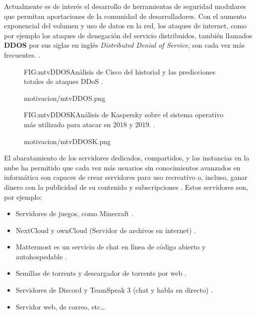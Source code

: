 Actualmente es de interés  \cite{mtvINTR} el desarrollo de herramientas de seguridad modulares que permitan aportaciones de la comunidad de desarrolladores. Con el aumento exponencial del volumen y uso de datos en la red, los ataques de internet, como por ejemplo los ataques de denegación del servicio distribuidos, también llamados \textbf{DDOS} por sus siglas en inglés \textit{Distributed Denial of Service}, son cada vez más frecuentes. \cite{mtvMine}.

\begin{figure}[Análisis de Cisco del historial y las predicciones totales de ataques DDoS.]{FIG:mtvDDOS}{Análisis de Cisco del historial y las predicciones totales de ataques DDoS \cite{mtvDDOSCISCO}.}
  \begin{image}{}{}{motivacion/mtvDDOS.png}
  \end{image}
\end{figure}

\begin{figure}[Análisis de Kaspersky sobre DDOS.]{FIG:mtvDDOSK}{Análisis de Kaspersky sobre el sistema operativo más utilizado para atacar en 2018 y 2019. \cite{mtvDDOSK}.}
  \begin{image}{}{}{motivacion/mtvDDOSK.png}
  \end{image}
\end{figure}


El abaratamiento de los servidores dedicados, compartidos, y las instancias en la nube \cite{mtvPrecios} ha permitido que cada vez más usuarios sin conocimientos avanzados en informática son capaces de crear servidores para uso recreativo o, incluso, ganar dinero con la publicidad  \cite{mtvGoogle} de su contenido y subscripciones \cite{mtvMine}.  Estos servidores son, por ejemplo:
\\
\begin{itemize}
\item Servidores de juegos, como Minecraft \cite{mtvMines}.
\item NextCloud y ownCloud (Servidor de archivos en internet) \cite{mtvalmnube}.
\item Mattermost es un servicio de chat en línea de código abierto y autohospedable \cite{mtvmt}.
\item Semillas de torrents y descargador de torrents por web \cite{mtvtorrent}.
\item Servidores de Discord y TeamSpeak 3 (chat y habla en directo) \cite{mtvts3}.
\item Servidor web, de correo, etc…
\end{itemize}

